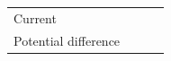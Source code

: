 \begin{enumerate}[noitemsep, label=\textbf{\arabic*}. ]
{\begin{tabular}[t]{|l|l|l|l|}
    
        Current &
    
    
         &
    
    
         &
    
    
     \tabularnewline\cline{1-1}\cline{2-2}\cline{3-3}\cline{4-4}
    
    
        Potential difference &
    
    
         &
    
    
         &
    
    
     \tabularnewline\cline{1-1}\cline{2-2}\cline{3-3}\cline{4-4}
    \end{tabular}} %
        \addtolength{\mytableboxheight}{\mytableboxdepth}
        \addtocounter{footnote}{-0}
        

\end{enumerate}
